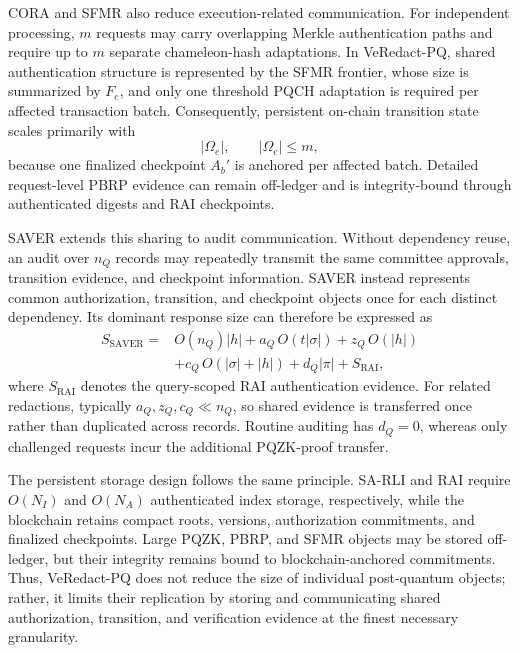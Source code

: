 \documentclass[lettersize,journal]{IEEEtran}
\begin{document}
CORA and SFMR also reduce execution-related communication. For
independent processing, $m$ requests may carry overlapping Merkle
authentication paths and require up to $m$ separate chameleon-hash
adaptations. In VeRedact-PQ, shared authentication structure is
represented by the SFMR frontier, whose size is summarized by $F_e$,
and only one threshold PQCH adaptation is required per affected
transaction batch. Consequently, persistent on-chain transition state
scales primarily with
\begin{equation}
|\Omega_e|,
\qquad |\Omega_e|\leq m,
\end{equation}
because one finalized checkpoint $A_b'$ is anchored per affected batch.
Detailed request-level PBRP evidence can remain off-ledger and is
integrity-bound through authenticated digests and RAI checkpoints.

SAVER extends this sharing to audit communication. Without dependency
reuse, an audit over $n_Q$ records may repeatedly transmit the same
committee approvals, transition evidence, and checkpoint information.
SAVER instead represents common authorization, transition, and
checkpoint objects once for each distinct dependency. Its dominant
response size can therefore be expressed as
\begin{equation}
\begin{aligned}
S_{\mathrm{SAVER}}
={}&O(n_Q)|h|
+a_Q\,O(t|\sigma|)
+z_Q\,O(|h|)\\
&+c_Q\,O(|\sigma|+|h|)
+d_Q|\pi|
+S_{\mathrm{RAI}},
\end{aligned}
\label{eq:saver_comm}
\end{equation}
where $S_{\mathrm{RAI}}$ denotes the query-scoped RAI authentication
evidence. For related redactions, typically
$a_Q,z_Q,c_Q\ll n_Q$, so shared evidence is transferred once rather
than duplicated across records. Routine auditing has $d_Q=0$, whereas
only challenged requests incur the additional PQZK-proof transfer.

The persistent storage design follows the same principle. SA-RLI and
RAI require $O(N_I)$ and $O(N_A)$ authenticated index storage,
respectively, while the blockchain retains compact roots, versions,
authorization commitments, and finalized checkpoints. Large PQZK,
PBRP, and SFMR objects may be stored off-ledger, but their integrity
remains bound to blockchain-anchored commitments. Thus, VeRedact-PQ
does not reduce the size of individual post-quantum objects; rather, it
limits their replication by storing and communicating shared
authorization, transition, and verification evidence at the finest
necessary granularity.
\end{document}
